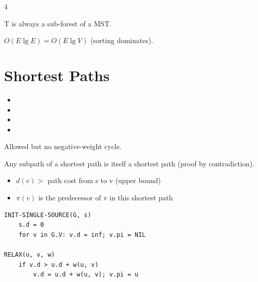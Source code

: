\documentclass[8pt,a4paper,landscape]{extarticle}
\begin{document}
\begin{multicols*}{4}
\begin{thm}[title=Why does it work?]
T is always a sub-forest of a MST.
\end{thm}

\begin{prop}[title=Kruskal's runtime]
$O(E\lg E) = O(E\lg V)$ (sorting dominates).
\end{prop}


\section{Shortest Paths}

\begin{defn}[title=Problem variants]
\begin{itemize}
  \item {}
  \item {}
  \item {}
  \item {}
\end{itemize}
\end{defn}

\begin{warn}[title=Negative weights]
Allowed but no negative-weight cycle.
\end{warn}

\begin{prop}[title=Optimal substructure]
Any subpath of a shortest path is itself a shortest path (proof by contradiction).
\end{prop}

\begin{warn}[title=Helpful tools]
\begin{itemize}
  \item $d(v) > $ path cost from s to v (upper bound)
  \item $\pi(v) $ is the predecessor of v in this shortest path
\end{itemize}
\end{warn}

\begin{lstlisting}
INIT-SINGLE-SOURCE(G, s)
    s.d = 0
    for v in G.V: v.d = inf; v.pi = NIL

RELAX(u, v, w)
    if v.d > u.d + w(u, v)
        v.d = u.d + w(u, v); v.pi = u
\end{lstlisting}


\end{multicols*}
\end{document}
